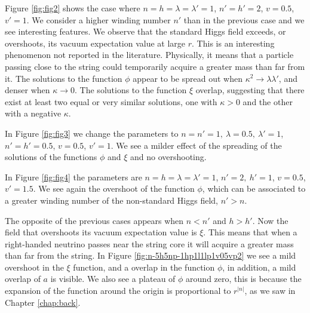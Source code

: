 Figure \ref{fig:fig2} shows the case where $n=h=\lambda=\lambda'=1$, $n'=h'=2$, $v=0.5$, $v'=1$. We consider a higher winding number $n'$ than in the previous case and we see interesting features. We observe that the standard Higgs field exceeds, or overshoots, its vacuum expectation value at large $r$. This is an interesting phenomenon not reported in the literature.  Physically, it means that a particle passing close to the string could temporarily acquire a greater mass than far from it.
The solutions to the function $\phi$ appear to be spread out when $\kappa^2\to \lambda\lambda'$, and denser when $\kappa\to 0$. The solutions to the function $\xi$ overlap, suggesting that there exist at least two equal or very similar solutions, one with $\kappa>0$ and the other with a negative $\kappa$.%

In Figure \ref{fig:fig3} we change the parameters to $n=n'=1,\ \lambda=0.5,\  \lambda'=1$, $n'=h'=0.5$, $v=0.5$, $v'=1$. We see a milder effect of the spreading of the solutions of the functions $\phi$ and $\xi$ and no overshooting.

In Figure \ref{fig:fig4} the parameters are $n=h=\lambda=\lambda'=1$, $n'=2,\ h'=1$, $v=0.5$, $v'=1.5$. We see again the overshoot of the function $\phi$, which can be associated to a greater winding number of the non-standard Higgs field, $n'>n$. %

The opposite of the previous cases appears when $n<n'$ and $h>h'$. Now the field that overshoots its vacuum expectation value is $\xi$. This means that when a right-handed neutrino passes near the string core it will acquire a greater mass than far from the string. In Figure \ref{fig:n-5h5np-1hp1l1lp1v05vp2} we see a mild overshoot in the $\xi$ function, and a overlap in the function $\phi$, in addition, a mild overlap of $a$ is visible. We also see a plateau of $\phi$ around zero, this is because the expansion of the function around the origin is proportional to $r^{|n|}$, as we saw in Chapter \ref{chap:back}.


